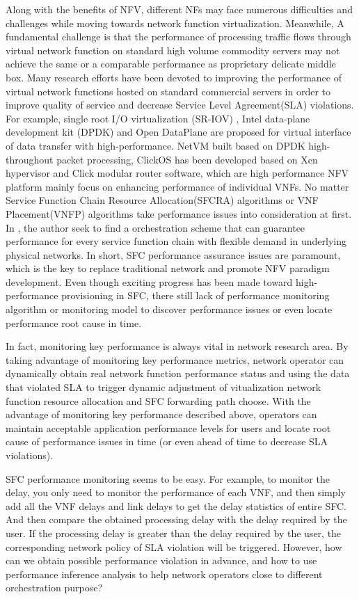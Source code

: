 \documentclass{ieeeaccess}
\begin{document}
Along with the benefits of NFV, different NFs may face numerous difficulties and challenges while moving towards network function virtualization. Meanwhile, A fundamental challenge is that the performance of processing traffic flows through virtual network function on standard high volume commodity servers  may not achieve the same or a comparable performance as proprietary delicate middle box. Many research efforts have been devoted to improving the performance of virtual network functions hosted on standard commercial servers in order to improve quality of service and decrease Service Level Agreement(SLA) violations. For example, single root I/O virtualization (SR-IOV)\cite{b10} , Intel data-plane development kit (DPDK)\cite{b11} and Open DataPlane\cite{b12} are proposed for virtual interface of data transfer with high-performance.	NetVM built based on DPDK high-throughout packet processing\cite{b13}, ClickOS\cite{b14}  has been developed based on Xen hypervisor and Click modular\cite{b15} router software, which are high performance NFV platform mainly focus on enhancing performance of individual VNFs. No matter Service Function Chain Resource Allocation(SFCRA) algorithms or VNF Placement(VNFP) algorithms take performance issues into consideration at first\cite{b16,b17,b18}. In \cite{b19}, the author seek to find a orchestration scheme that can guarantee performance for every service function chain with flexible demand in underlying physical networks. In short, SFC performance assurance issues are paramount, which is the key to replace traditional network and promote NFV paradigm development. Even though exciting progress has been made toward high-performance provisioning in SFC, there still lack of performance monitoring algorithm or monitoring model to discover performance issues or even locate performance root cause in time.

In fact, monitoring key performance is always vital in network research area. By taking advantage of monitoring key performance metrics, network operator can dynamically obtain real network function performance status and using the data that violated SLA to trigger dynamic adjustment of vitualization network function resource allocation and SFC forwarding path choose. With the advantage of monitoring key performance described above, operators can maintain acceptable application performance levels for users and locate root cause of performance issues in time (or even ahead of time to decrease SLA violations).

SFC performance monitoring seems to be easy. For example, to monitor the delay, you only need to monitor the performance of each VNF, and then simply add all the VNF delays and link delays to get the delay statistics of entire SFC. And then compare the obtained processing delay with the delay required by the user. If the processing delay is greater than the delay required by the user, the corresponding network policy of SLA violation will be triggered. However, how can we obtain possible performance violation in advance, and how to use performance inference analysis to help network operators close to different orchestration purpose?
\end{document}

